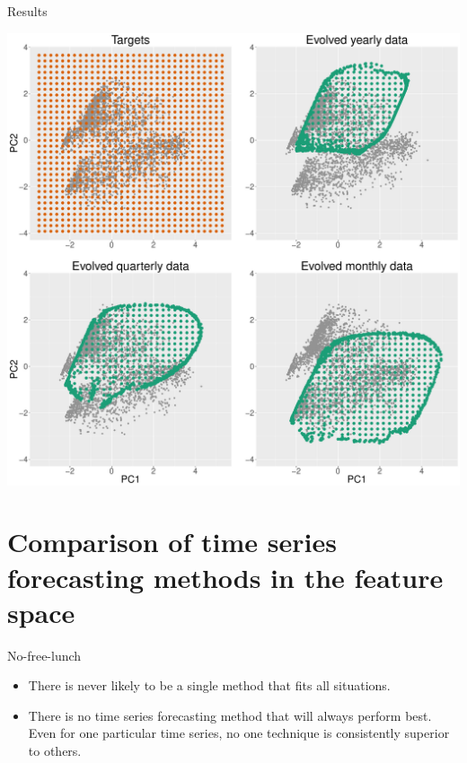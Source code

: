 \documentclass[12pt,ignorenonframetext,compress]{beamer}
\begin{document}
\begin{frame}{Results}

\centerline{\includegraphics[width=\textwidth]{figures/EvolvedTSnbDiffLsep.pdf}}

\end{frame}

\section{Comparison of time series forecasting methods in the feature
space}\label{comparison-of-time-series-forecasting-methods-in-the-feature-space}

\begin{frame}{No-free-lunch}

\begin{itemize}
\item
  There is never likely to be a single method that fits all situations.
\item
  There is no time series forecasting method that will always perform
  best. Even for one particular time series, no one technique is
  consistently superior to others.
\end{itemize}

\end{frame}
\end{document}
